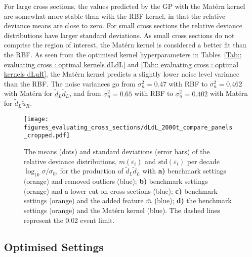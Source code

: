 \documentclass[twoside,english]{uiofysmaster}
\begin{document}
{{For large cross sections, the values predicted by the GP with the Mat\'{e}rn kernel are somewhat more stable than with the RBF kernel, in that the relative deviance means are close to zero. For small cross sections the relative deviance distributions have larger standard deviations. As small cross sections do not comprise the region of interest, the Mat\'{e}rn kernel is considered a better fit than the RBF. As seen from the optimised kernel hyperparameters in Tables~\ref{Tab:: evaluating cross : optimal kernels dLdL} and \ref{Tab:: evaluating cross : optimal kernels dLuR}, the Mat\'{e}rn kernel predicts a slightly lower noise level variance than the RBF. The noise variances go from $\sigma_n^2 = 0.47$ with RBF to $\sigma_n^2 = 0.462$ with Mat\'{e}rn for $\widetilde{d}_L \widetilde{d}_L$, and from $\sigma_n^2 = 0.65$ with RBF to $\sigma_n^2 = 0.402$ with Mat\'{e}rn for $\widetilde{d}_L \widetilde{u}_R$. 

\begin{figure}
\texttt{[image: figures\_evaluating\_cross\_sections/dLdL\_2000t\_compare\_panels\_cropped.pdf]}
\caption{The means (dots) and standard deviations (error bars) of the relative deviance distributions, $m(\varepsilon_i)$ and $\mathrm{std}(\varepsilon_i)$ per decade $\log_{10} \sigma/ \sigma_0$, for the production of $\widetilde{d}_L \widetilde{d}_L$ with \textbf{a)} benchmark settings (orange) and removed outliers (blue); \textbf{b)} benchmark settings (orange) and a lower cut on cross sections (blue); \textbf{c)} benchmark settings (orange) and the added feature $\bar{m}$ (blue); \textbf{d)} the benchmark settings (orange) and the Mat\'{e}rn kernel (blue). The dashed lines represent the 0.02 event limit.}
\label{Fig:: evaluating cross : RD compare panels dLdL}
\end{figure}


\subsection{Optimised Settings}\label{Sec:: evaluating cross : Optimal Settings}

}}
\end{document}
